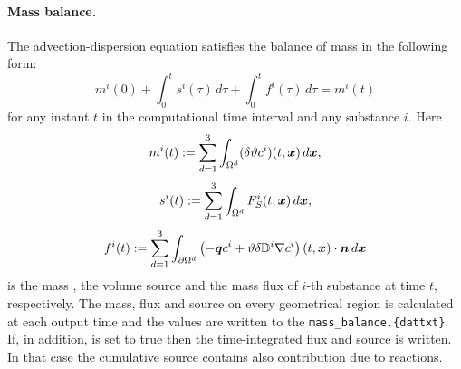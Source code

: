 \paragraph{Mass balance.}
The advection-dispersion equation satisfies the balance of mass in the following form:
$$ m^i(0) + \int_0^t s^i(\tau) \,d\tau + \int_0^t f^i(\tau) \,d\tau = m^i(t) $$
for any instant $t$ in the computational time interval and any substance $i$.
Here
$$ m^i(t) := \sum_{d=1}^3\int_{\Omega^d}(\delta\vartheta c^i)(t,\mathbf{\boldsymbol{x}})\,d\mathbf{\boldsymbol{x}}, $$
$$ s^i(t) := \sum_{d=1}^3\int_{\Omega^d}F_S^i(t,\mathbf{\boldsymbol{x}})\,d\mathbf{\boldsymbol{x}}, $$
$$ f^i(t) := \sum_{d=1}^3\int_{\partial\Omega^d}\left(-\mathbf{\boldsymbol{q}} c^i + \vartheta\delta{{\mathbb{D}}}^i\nabla c^i\right)(t,\mathbf{\boldsymbol{x}})\cdot\mathbf{\boldsymbol{n}} \,d\mathbf{\boldsymbol{x}} $$
is the mass , the volume source  and the mass flux  of $i$-th substance at time $t$, respectively.
The mass, flux and source on every geometrical region is calculated at each output time and the values are written to the  \texttt{mass\_balance.\{dat\textbar txt\}}.
If, in addition,  is set to true then the time-integrated flux and source is written.
In that case the cumulative source contains also contribution due to reactions.






